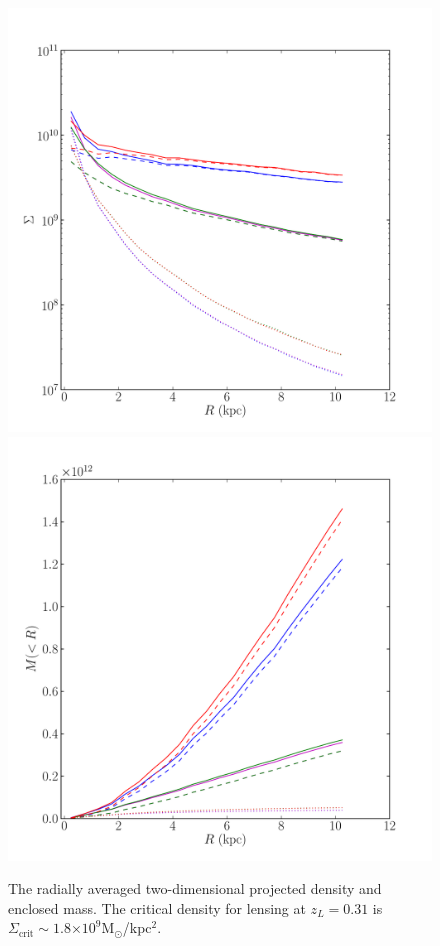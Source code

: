 \documentclass[usenatbib,onecolumn,galley]{mn2e}
\newcommand{\Msun}{\ensuremath{\mathrm{M}_\odot}}
\newcommand{\e}[1]{\ensuremath{\times 10^{#1}}}
\begin{document}
\begin{figure}
\begin{center}
\includegraphics[width=.5\columnwidth]{MockGalProfile-b.pdf}\break
\includegraphics[width=.5\columnwidth]{MockGalProfile-c.pdf}
\end{center}
\caption{The radially averaged two-dimensional projected density and
  enclosed mass.  The critical density for lensing at $z_L=0.31$ is
  $\Sigma_\mathrm{crit}\sim 1.8\e{9}$\Msun/kpc$^2$.}
\label{mock lenses}
\end{figure}
\end{document}
